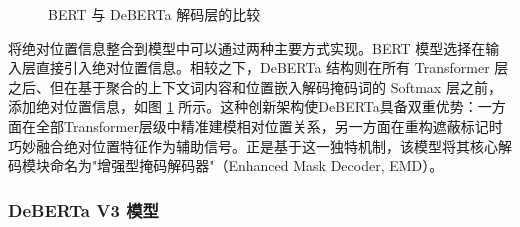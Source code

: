 \begin{figure}[htbp]
\centering  
{}
\hfill
{}

\caption{BERT 与 DeBERTa 解码层的比较 \cite{he_deberta_2021}}
\label{fig:emd}
\end{figure}

将绝对位置信息整合到模型中可以通过两种主要方式实现。BERT 模型选择在输入层直接引入绝对位置信息。相较之下，DeBERTa 结构则在所有 Transformer 层之后、但在基于聚合的上下文词内容和位置嵌入解码掩码词的 Softmax 层之前，添加绝对位置信息，如图 \ref{fig:emd} 所示。这种创新架构使DeBERTa具备双重优势：一方面在全部Transformer层级中精准建模相对位置关系，另一方面在重构遮蔽标记时巧妙融合绝对位置特征作为辅助信号。正是基于这一独特机制，该模型将其核心解码模块命名为"增强型掩码解码器"（Enhanced Mask Decoder, EMD）。

\subsubsection{DeBERTa V3 模型}

